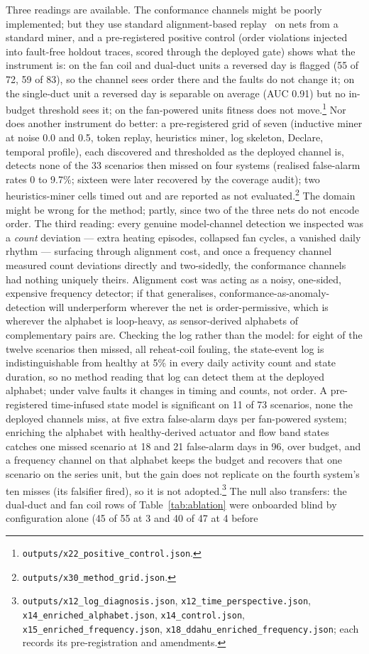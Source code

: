 \documentclass[runningheads]{llncs}
\begin{document}
Three readings are available. The conformance channels might be poorly implemented; but they use standard alignment-based replay~\cite{vanderaalst2012replaying} on nets from a standard miner, and a pre-registered positive control (order violations injected into fault-free holdout traces, scored through the deployed gate) shows what the instrument is: on the fan coil and dual-duct units a reversed day is flagged (55 of 72, 59 of 83), so the channel sees order there and the faults do not change it; on the single-duct unit a reversed day is separable on average (AUC 0.91) but no in-budget threshold sees it; on the fan-powered units fitness does not move.\footnote{\texttt{outputs/x22\_positive\_control.json}.} Nor does another instrument do better: a pre-registered grid of seven (inductive miner at noise 0.0 and 0.5, token replay, heuristics miner, log skeleton, Declare, temporal profile), each discovered and thresholded as the deployed channel is, detects none of the 33 scenarios then missed on four systems (realised false-alarm rates 0 to 9.7\%; sixteen were later recovered by the coverage audit); two heuristics-miner cells timed out and are reported as not evaluated.\footnote{\texttt{outputs/x30\_method\_grid.json}.} The domain might be wrong for the method; partly, since two of the three nets do not encode order. The third reading: every genuine model-channel detection we inspected was a \emph{count} deviation --- extra heating episodes, collapsed fan cycles, a vanished daily rhythm --- surfacing through alignment cost, and once a frequency channel measured count deviations directly and two-sidedly, the conformance channels had nothing uniquely theirs. Alignment cost was acting as a noisy, one-sided, expensive frequency detector; if that generalises, conformance-as-anomaly-detection will underperform wherever the net is order-permissive, which is wherever the alphabet is loop-heavy, as sensor-derived alphabets of complementary pairs are. Checking the log rather than the model: for eight of the twelve scenarios then missed, all reheat-coil fouling, the state-event log is indistinguishable from healthy at 5\% in every daily activity count and state duration, so no method reading that log can detect them at the deployed alphabet; under valve faults it changes in timing and counts, not order. A pre-registered time-infused state model is significant on 11 of 73 scenarios, none the deployed channels miss, at five extra false-alarm days per fan-powered system; enriching the alphabet with healthy-derived actuator and flow band states catches one missed scenario at 18 and 21 false-alarm days in 96, over budget, and a frequency channel on that alphabet keeps the budget and recovers that one scenario on the series unit, but the gain does not replicate on the fourth system's ten misses (its falsifier fired), so it is not adopted.\footnote{\texttt{outputs/x12\_log\_diagnosis.json}, \texttt{x12\_time\_perspective.json}, \texttt{x14\_enriched\_alphabet.json}, \texttt{x14\_control.json}, \texttt{x15\_enriched\_frequency.json}, \texttt{x18\_ddahu\_enriched\_frequency.json}; each records its pre-registration and amendments.} The null also transfers: the dual-duct and fan coil rows of Table~\ref{tab:ablation} were onboarded blind by configuration alone (45 of 55 at 3 and 40 of 47 at 4 before 
\end{document}
